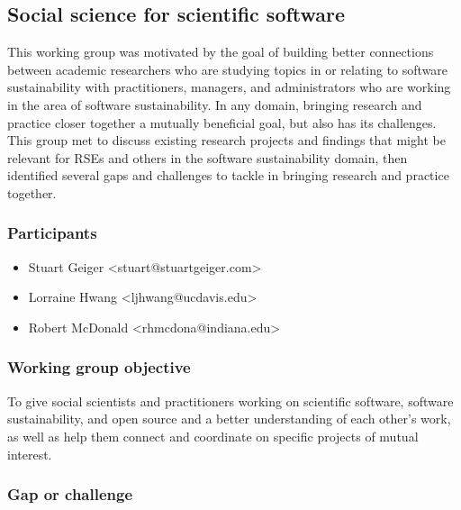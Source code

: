 \subsection{Social science for scientific software}
\label{sec:social}



This working group was motivated by the goal of building better connections between academic researchers who are studying topics in or relating to software sustainability with practitioners, managers, and administrators who are working in the area of software sustainability. In any domain, bringing research and practice closer together a mutually beneficial goal, but also has its challenges. This group met to discuss existing research projects and findings that might be relevant for RSEs and others in the software sustainability domain, then identified several gaps and challenges to tackle in bringing research and practice together.

\subsubsection{Participants}

\begin{itemize}
  \item Stuart Geiger <stuart@stuartgeiger.com>
  \item Lorraine Hwang <ljhwang@ucdavis.edu>
  \item Robert McDonald <rhmcdona@indiana.edu>
\end{itemize}

\subsubsection{Working group objective}

To give social scientists and practitioners working on scientific software, software sustainability, and open source and a better understanding of each other's work, as well as help them connect and coordinate on specific projects of mutual interest.

\subsubsection{Gap or challenge}

